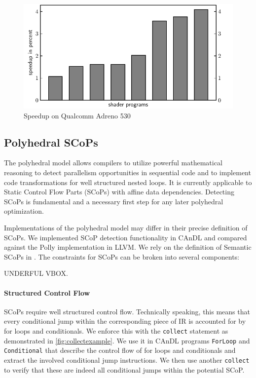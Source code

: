 \begin{figure}[ht]
\centering
\includegraphics[width=\linewidth]{figures/qualcomm_plot.pdf}
\caption{Speedup on Qualcomm Adreno 530}
\label{fig:qualcommspeedup}
\end{figure}

\subsection{Polyhedral SCoPs}

    The polyhedral model allows compilers to utilize powerful mathematical
    reasoning to detect parallelism opportunities in sequential code and to
    implement code transformations for well structured nested
    loops.
    It is currently applicable to Static Control Flow Parts (SCoPs) with affine
    data dependencies.
    Detecting SCoPs is fundamental and a necessary first step for any later
    polyhedral optimization.

    Implementations of the polyhedral model may differ in their precise
    definition of SCoPs.
    We implemented SCoP detection functionality in CAnDL and compared against
    the Polly implementation in LLVM.
    We rely on the definition of Semantic SCoPs in \cite{Lengauer2012Polly}.
    The constraints for SCoPs can be broken into several components:

    UNDERFUL VBOX.


    \paragraph{Structured Control Flow}
    SCoPs require well structured control flow.
    Technically speaking, this means that every conditional jump within the
    corresponding piece of IR is accounted for by for loops and conditionals.
    We enforce this with the \texttt{collect} statement as demonstrated in
    \autoref{fig:collectexample}.
    We use it in CAnDL programs \texttt{ForLoop} and
    \texttt{Conditional} that describe the control flow of for loops and
    conditionals and extract the involved conditional jump instructions.
    We then use another \texttt{collect} to verify that these are indeed all
    conditional jumps within the potential SCoP.

